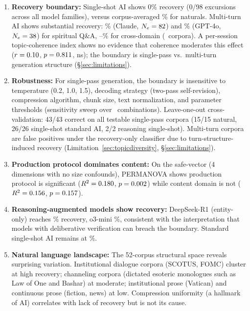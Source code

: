 \documentclass[11pt]{article}
\begin{document}
\begin{enumerate}
\item \textbf{Recovery boundary:} Single-shot AI shows 0\% recovery (0/98 excursions across all model families), versus corpus-averaged \recNatCorpusAvg\% for naturals. Multi-turn AI shows substantial recovery: \recClaudeMT\% (Claude, $N_e = 82$) and \recGPTMT\% (GPT-4o, $N_e = 38$) for spiritual Q\&A, \recMTXdomMin--\recMTXdomMax\% for cross-domain (\nMTXdom\ corpora). A per-session topic-coherence index shows no evidence that coherence moderates this effect ($r = 0.10$, $p = 0.811$, ns); the boundary is single-pass vs.\ multi-turn generation structure (\S\ref{sec:limitations}).

\item \textbf{Robustness:} For single-pass generation, the boundary is insensitive to temperature (0.2, 1.0, 1.5), decoding strategy (two-pass self-revision), compression algorithm, chunk size, text normalization, and parameter thresholds (sensitivity sweep over \nSensitivityCombos\ combinations). Leave-one-out cross-validation: 43/43 correct on all testable single-pass corpora (15/15 natural, 26/26 single-shot standard AI, 2/2 reasoning single-shot). Multi-turn corpora are false positives under the recovery-only classifier due to turn-structure-induced recovery (Limitation~\ref{sec:topicdiversity}, \S\ref{sec:limitations}).

\item \textbf{Production protocol dominates content:} On the safe-vector (4 dimensions with no size confounds), PERMANOVA shows production protocol is significant ($R^2 = 0.180$, $p = 0.002$) while content domain is not ($R^2 = 0.156$, $p = 0.157$).

\item \textbf{Reasoning-augmented models show recovery:} DeepSeek-R1 (entity-only) reaches \recReasoningDS\% recovery, o3-mini \recReasoningOiii\%, consistent with the interpretation that models with deliberative verification can breach the boundary. Standard single-shot AI remains at \recAISingleShot\%.

\item \textbf{Natural language landscape:} The 52-corpus structural space reveals surprising variation. Institutional dialogue corpora (SCOTUS, FOMC) cluster at high recovery; channeling corpora (dictated esoteric monologues such as Law of One and Bashar) at moderate; institutional prose (Vatican) and continuous prose (fiction, news) at low. Compression uniformity (a hallmark of AI) correlates with lack of recovery but is not its cause.
\end{enumerate}
\end{document}
